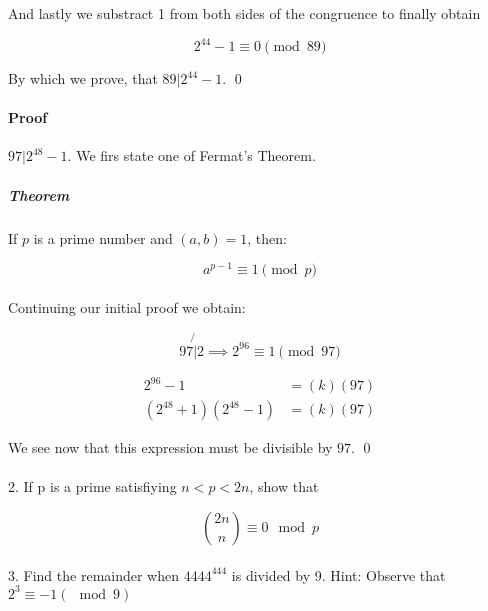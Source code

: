 \documentclass{article}
\begin{document}
And lastly we substract 1 from both sides of the congruence to finally obtain

$$2^{44} - 1 \equiv 0 \pmod{89}$$

By which we prove, that $89|2^{44} - 1$. \qed

\paragraph{Proof} $97|2^{48} - 1$. We firs state one of Fermat's Theorem.

\subparagraph{Theorem} If $p$ is a prime number and $(a,b) = 1$, then:

$$a^{p-1} \equiv{ 1 \pmod{p} }$$

\paragraph{} Continuing our initial proof we obtain:

$$97 \not{|} 2 \implies 2^{96} \equiv{1\pmod{97}}$$

\begin{align*}
    2^{96} - 1 &= (k)(97)\\
    (2^{48} + 1)(2^{48} - 1) &= (k)(97)
\end{align*}

We see now that this expression must be divisible by $97$. \qed

\paragraph{}2. If p is a prime satisfiying $n<p<2n$, show that

$$\binom{2n}{n} \equiv 0\mod{p} $$

\paragraph{}3. Find the remainder when $4444^{444}$ is divided by 9. Hint: Observe that $2^{3} \equiv -1(\mod{9})$
	
\end{document}
